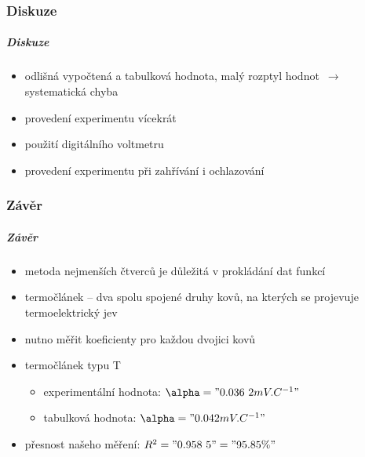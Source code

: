 \documentclass[smaller,aspectratio=1610,handout]{beamer}
\begin{document}
\section{Diskuze}
\begin{frame}
	\frametitle{Diskuze}
	\begin{itemize}
		\item odlišná vypočtená a tabulková hodnota, malý rozptyl 
			hodnot~$\rightarrow$ systematická chyba
		\item provedení experimentu vícekrát
		\item použití digitálního voltmetru
		\item provedení experimentu při zahřívání i ochlazování
	\end{itemize}
\end{frame}

\section{Závěr}
\begin{frame}
	\frametitle{Závěr}
	\begin{itemize}
		\item metoda nejmenších čtverců je důležitá v prokládání dat funkcí
		\item termočlánek -- dva spolu spojené druhy kovů, na kterých se
			projevuje termoelektrický jev
		\item nutno měřit koeficienty pro každou dvojici kovů
		\item termočlánek typu T
			\begin{itemize}
				\item experimentální hodnota: $\alpha = "0.036~2 mV.C^{-1}"$
				\item tabulková hodnota: $\alpha = "0.042 mV.C^{-1}"$
			\end{itemize}
		\item přesnost našeho měření: $R^2="0.958~5"="95.85 \%"$
	\end{itemize}
\end{frame}


\part{}

\begin{frame}[plain]
	\titlepage
\end{frame}
\end{document}
